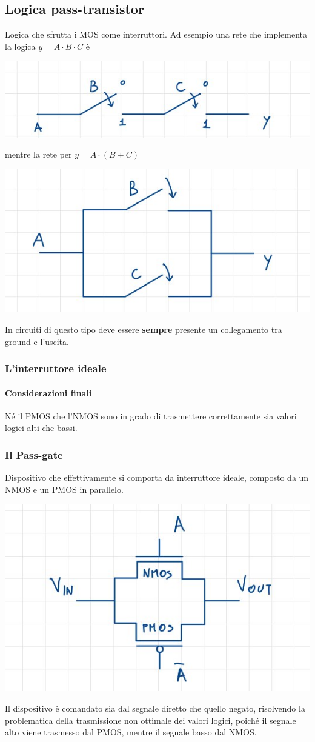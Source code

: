 \documentclass[11pt,a4paper,]{article}
\begin{document}
\subsection{Logica pass-transistor}
Logica che sfrutta i MOS come interruttori. 
Ad esempio una rete che implementa la logica $y=A\cdot B \cdot C$ è 
\begin{center}
	\includegraphics[width=0.3\linewidth]{"img/es pass tra"}
\end{center}
mentre la rete per $y= A\cdot (B+C)$
\begin{center}
	\includegraphics[width=0.3\linewidth]{"img/es pass tra 2"}
\end{center}
\begin{nota}
	In circuiti di questo tipo deve essere \textbf{sempre} presente un collegamento tra ground e l'uscita.
\end{nota}
\subsubsection{L'interruttore ideale}
\paragraph{Considerazioni finali}
Né il PMOS che l'NMOS sono in grado di trasmettere correttamente sia valori logici alti che bassi.
\subsubsection{Il Pass-gate}
Dispositivo che effettivamente si comporta da interruttore ideale, composto da un NMOS e un PMOS in parallelo.
\begin{center}
	\includegraphics[width=0.3\linewidth]{"img/pass gate"}
\end{center}
Il dispositivo è comandato sia dal segnale diretto che quello negato, risolvendo la problematica della trasmissione non ottimale dei valori logici, poiché il segnale alto viene trasmesso dal PMOS, mentre il segnale basso dal NMOS.
\end{document}
